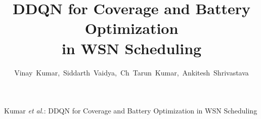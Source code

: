 \documentclass[journal]{IEEEtran}
\begin{document}

\title{DDQN for Coverage and Battery Optimization\\in WSN Scheduling}

\author{Vinay~Kumar,~Siddarth~Vaidya,~Ch~Tarun~Kumar,~Ankitesh~Shrivastava%
}

%
{Kumar \MakeLowercase{\textit{et al.}}: DDQN for Coverage and Battery
Optimization in WSN Scheduling}



\maketitle

\end{document}
